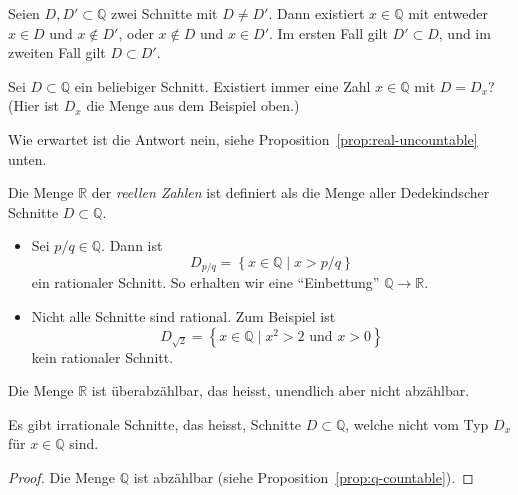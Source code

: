 \documentclass[../main.tex]{subfiles}
\begin{document}
\begin{remark}
  Seien $D, D' \subset \mathbb Q$ zwei Schnitte mit $D \neq D'$.
  Dann existiert $x \in \mathbb Q$ mit entweder $x \in D$ und $x \notin D'$,
  oder $x \notin D$ und $x \in D'$.
  Im ersten Fall gilt $D' \subset D$, und im zweiten Fall gilt $D \subset D'$.
\end{remark}

\begin{question}
  Sei $D \subset \mathbb Q$ ein beliebiger Schnitt. Existiert immer
  eine Zahl $x \in \mathbb Q$ mit $D = D_{x}$?
  (Hier ist $D_{x}$ die Menge aus dem Beispiel oben.)
\end{question}

Wie erwartet ist die Antwort nein, siehe Proposition~\ref{prop:real-uncountable} unten.


\begin{definition}
  Die Menge $\mathbb R$ der \emph{reellen Zahlen} ist definiert als die Menge
  aller Dedekindscher Schnitte $D \subset \mathbb Q$.
\end{definition}

\begin{examples}
  \leavevmode
  \begin{itemize}
    \item Sei $p/q \in \mathbb Q$. Dann ist
      \[ D_{p/q} = \left\{x \in \mathbb Q \mid x> p/q \right\}\]
      ein rationaler Schnitt. So erhalten wir eine ``Einbettung''
      $\mathbb Q \to \mathbb R$.
    \item Nicht alle Schnitte sind rational. Zum Beispiel ist
      \[D_{\sqrt 2} = \left\{x \in \mathbb Q \mid x^{2} > 2 \text{ und } x > 0\right\}\]
      kein rationaler Schnitt.
  \end{itemize}
\end{examples}

\begin{proposition}[Cantor]\label{prop:real-uncountable}
  Die Menge $\mathbb R$ ist überabzählbar, das heisst, unendlich
  aber nicht abzählbar.
\end{proposition}

\begin{corollary}
  Es gibt irrationale Schnitte, das heisst, Schnitte $D \subset \mathbb Q$,
  welche nicht vom Typ $D_{x}$ für $x \in \mathbb Q$ sind.
\end{corollary}

\begin{proof}
  Die Menge $\mathbb Q$ ist abzählbar (siehe Proposition~\ref{prop:q-countable}).
\end{proof}
\end{document}
